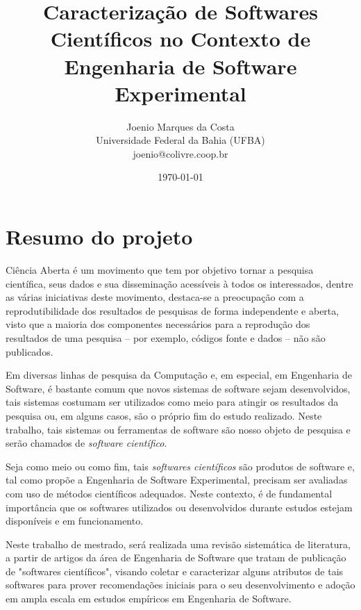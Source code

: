 \documentclass[12pt]{article}
\title{
  Caracterização de Softwares Científicos no Contexto de Engenharia de
  Software Experimental
}
\author{Joenio Marques da Costa\\
  {\small Universidade Federal da Bahia (UFBA)} \\
  {\small joenio@colivre.coop.br}
}
\date{\today}
\begin{document}
\maketitle

\section{Resumo do projeto}

Ciência Aberta é um movimento que tem por objetivo tornar a pesquisa
científica, seus dados e sua disseminação acessíveis à todos os interessados,
dentre as várias iniciativas deste movimento, destaca-se a preocupação com a
reprodutibilidade dos resultados de pesquisas de forma independente e aberta,
visto que a maioria dos componentes necessários para a reprodução dos
resultados de uma pesquisa -- por exemplo, códigos fonte e dados -- não são
publicados.

Em diversas linhas de pesquisa da Computação e, em especial, em Engenharia de
Software, é bastante comum que novos sistemas de software sejam desenvolvidos,
tais sistemas costumam ser utilizados como meio para atingir os resultados da
pesquisa ou, em alguns casos, são o próprio fim do estudo realizado. Neste
trabalho, tais sistemas ou ferramentas de software são nosso objeto de
pesquisa e serão chamados de {\it software científico}.

Seja como meio ou como fim, tais {\it softwares científicos} são produtos de
software e, tal como propõe a Engenharia de Software Experimental, precisam
ser avaliadas com uso de métodos científicos adequados. Neste contexto, é de
fundamental importância que os softwares utilizados ou desenvolvidos durante
estudos estejam disponíveis e em funcionamento.


Neste trabalho de mestrado, será realizada uma revisão sistemática de
literatura, a partir de artigos da área de Engenharia de Software que tratam
de publicação de "softwares científicos", visando coletar e caracterizar
alguns atributos de tais softwares para prover recomendações iniciais para o
seu desenvolvimento e adoção em ampla escala em estudos empíricos em
Engenharia de Software.
\end{document}
